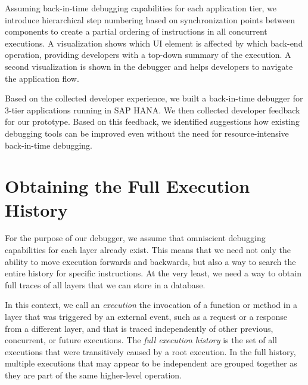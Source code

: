 Assuming back-in-time debugging capabilities for each application tier, we introduce hierarchical step numbering based on synchronization points between components to create a partial ordering of instructions in all concurrent executions.
A visualization shows which UI element is affected by which back-end operation, providing developers with a top-down summary of the execution.
A second visualization is shown in the debugger and helps developers to navigate the application flow.


Based on the collected developer experience, we built a back-in-time debugger for 3-tier applications running in SAP HANA.
We then collected developer feedback for our prototype.
Based on this feedback, we identified suggestions how existing debugging tools can be improved even without the need for resource-intensive back-in-time debugging.

%


\section{Obtaining the Full Execution History}

For the purpose of our debugger, we assume that omniscient debugging capabilities for each layer already exist.
This means that we need not only the ability to move execution forwards and backwards, but also a way to search the entire history for specific instructions.
At the very least, we need a way to obtain full traces of all layers that we can store in a database.

In this context, we call an \emph{execution} the invocation of a function or method in a layer that was triggered by an external event, such as a request or a response from a different layer, and that is traced independently of other previous, concurrent, or future executions.
The \emph{full execution history} is the set of all executions that were transitively caused by a root execution.
In the full history, multiple executions that may appear to be independent are grouped together as they are part of the same higher-level operation.

